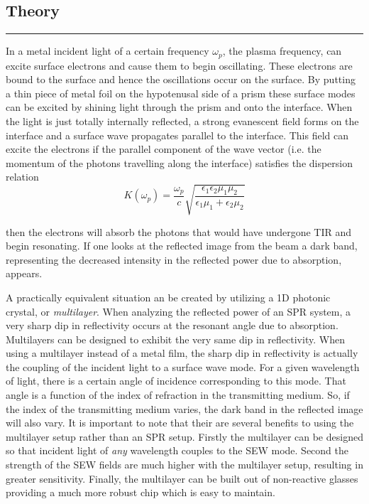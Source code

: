 \documentclass{report}
\begin{document}
\begin{flushleft}
	\section*{Theory}
	\vspace{-0.1cm}\hrule\vspace{0.2cm}
	\par{In a metal incident light of a certain frequency $\omega_p$, the plasma frequency, can excite surface electrons and cause them to begin oscillating. These electrons are bound to the surface and hence the oscillations occur on the surface. By putting a thin piece of metal foil on the hypotenusal side of a prism these surface modes can be excited by shining light through the prism and onto the interface. When the light is just totally internally reflected, a strong evanescent field forms on the interface and a surface wave propagates parallel to the interface. This field can excite the electrons if the parallel component of the wave vector (i.e. the momentum of the photons travelling along the interface) satisfies the dispersion relation}
\[
	K(\omega_p) = \frac{\omega_p}{c} \sqrt{\frac{\epsilon_1\epsilon_2\mu_1\mu_2}{\epsilon_1\mu_1 + \epsilon_2\mu_2}}
\]
	\par{then the electrons will absorb the photons that would have undergone TIR and begin resonating. If one looks at the reflected image from the beam a dark band, representing the decreased intensity in the reflected power due to absorption, appears.}
	\par{A practically equivalent situation an be created by utilizing a 1D photonic crystal, or \textit{multilayer}. When analyzing the reflected power of an SPR system, a very sharp dip in reflectivity occurs at the resonant angle due to absorption. Multilayers can be designed to exhibit the very same dip in reflectivity. When using a multilayer instead of a metal film, the sharp dip in reflectivity is actually the coupling of the incident light to a surface wave mode. For a given wavelength of light, there is a certain angle of incidence corresponding to this mode. That angle is a function of the index of refraction in the transmitting medium. So, if the index of the transmitting medium varies, the dark band in the reflected image will also vary. It is important to note that their are several benefits to using the multilayer setup rather than an SPR setup. Firstly the multilayer can be designed so that incident light of \textit{any} wavelength couples to the SEW mode. Second the strength of the SEW fields are much higher with the multilayer setup, resulting in greater sensitivity. Finally, the multilayer can be built out of non-reactive glasses providing a much more robust chip which is easy to maintain.\\
}
\end{flushleft}
\end{document}
